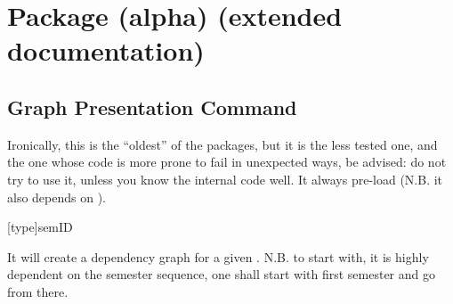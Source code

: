 \documentclass[dctools,english]{ufrgscca} %
\begin{document}
\section{ Package (alpha) (extended documentation)}

\subsection{Graph Presentation Command}
Ironically, this is the “oldest” of the  packages, but it is the less tested one, and the one whose code is more prone to fail in unexpected ways, be advised: do not try to use it, unless you know the internal code well. It always pre-load  (N.B. it also depends on ).

\begin{Macros}{\GraphSem}
    \begin{Syntax}%
        \Macro{\GraphSem}[type]{semID}
    \end{Syntax}
It will create a dependency graph for a given . N.B. to start with, it is highly dependent on the semester sequence, one shall start with first semester and go from there.
\end{Macros}

\fi
\end{document}
